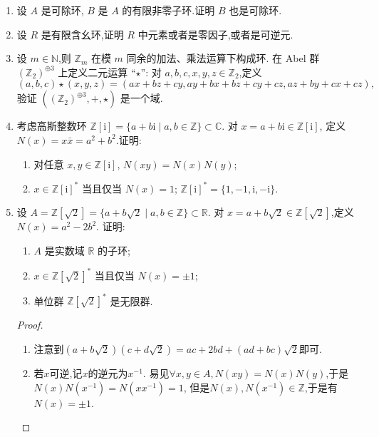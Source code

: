 \begin{enumerate}
\item 设 $ A $ 是可除环, $ B $ 是 $ A $ 的有限非零子环.证明 $ B $ 也是可除环.

\item 设 $ R $ 是有限含幺环,证明 $ R $ 中元素或者是零因子,或者是可逆元.

\item 设 $ m \in \mathbb{N} $,则 $ \mathbb{Z}_m $ 在模 $ m $ 同余的加法、乘法运算下构成环.
在 Abel 群 $ (\mathbb{Z}_2)^{\oplus 3} $ 上定义二元运算 ``$\star$'':
对 $ a, b, c, x, y, z \in \mathbb{Z}_2 $,定义
\[
(a, b, c) \star (x, y, z) = (ax + bz + cy, ay + bx + bz + cy + cz, az + by + cx + cz),
\]
验证 $((\mathbb{Z}_2)^{\oplus 3}, +, \star)$ 是一个域.

\item 考虑高斯整数环 $ \mathbb{Z}[\mathrm{i}] = \{a + b\mathrm{i} \mid a, b \in \mathbb{Z}\} \subset \mathbb{C} $.
对 $ x = a + b\mathrm{i} \in \mathbb{Z}[\mathrm{i}] $,
定义 $N(x) = x \bar{x} = a^2 + b^2$.证明:
\begin{enumerate}[label=(\arabic*)]
    \item 对任意 $x, y \in \mathbb{Z}[\mathrm{i}]$, $N(xy) = N(x)N(y)$;
    \item $ x \in \mathbb{Z}[\mathrm{i}]^* $ 当且仅当 $N(x) = 1$; $\mathbb{Z}[\mathrm{i}]^* = \{1, -1, \mathrm{i}, -\mathrm{i}\}$.
\end{enumerate}

\item 设 $ A = \mathbb{Z}[\sqrt{2}] = \{a + b\sqrt{2} \mid a, b \in \mathbb{Z}\} \subset \mathbb{R} $.
对 $ x = a + b\sqrt{2} \in \mathbb{Z}[\sqrt{2}] $,定义 $N(x) = a^2 - 2b^2$.
证明:
\begin{enumerate}[label=(\arabic*)]
    \item $ A $ 是实数域 $\mathbb{R}$ 的子环;
    \item $ x \in \mathbb{Z}[\sqrt{2}]^* $ 当且仅当 $ N(x) = \pm 1 $;
    \item 单位群 $\mathbb{Z}[\sqrt{2}]^*$ 是无限群.
\end{enumerate}
\begin{proof}
    \begin{enumerate}[label=(\arabic*)]
        \item 注意到$(a + b\sqrt{2})(c + d\sqrt{2})=ac+2bd+(ad+bc)\sqrt{2}$即可.
        \item 若$x$可逆,记$x$的逆元为$x^{-1}$.
        易见$\forall x,y \in A,N(xy)=N(x)N(y)$,于是$N(x)N(x^{-1})=N(xx^{-1})=1$,
        但是$N(x),N(x^{-1})\in\mathbb{Z}$,于是有$N(x)=\pm1$.


\end{enumerate}
\end{proof}
\end{enumerate}
